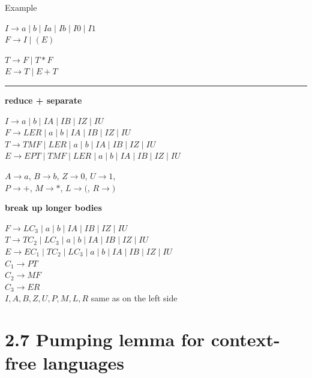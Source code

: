 \documentclass[handout]{beamer}
\begin{document}
\begin{frame}{Example}

	\begin{multicols}{2}
		
		$I\to a\mid b\mid Ia\mid Ib\mid I0\mid I1$\\
		$F\to I\mid (E)$
		
		$T\to F\mid T*F$\\
		$E\to T\mid E+T$
	\end{multicols}

	\bigskip
	\hrule

	\begin{multicols}{2}
		\small

		\textbf{reduce + separate}

		$I\to a\mid b\mid IA\mid IB\mid IZ\mid IU$\\
		$F\to LER\mid a\mid b\mid IA\mid IB\mid IZ\mid IU$\\
		$T\to TMF\mid LER\mid a\mid b\mid IA\mid IB\mid IZ\mid IU$\\
		$E\to EPT\mid TMF\mid LER\mid a\mid b\mid IA\mid IB\mid IZ\mid IU$\\

		\bigskip
		
		$A\to a$, $B\to b$, $Z\to 0$, $U\to 1$,\\
		$P\to +$, $M\to *$, $L\to ($, $R\to )$
		
		\bigskip\bigskip

		\textbf{break up longer bodies}

		$F\to LC_3\mid a\mid b\mid IA\mid IB\mid IZ\mid IU$\\
		$T\to TC_2\mid LC_3\mid a\mid b\mid IA\mid IB\mid IZ\mid IU$\\
		$E\to EC_1\mid TC_2\mid LC_3\mid a\mid b\mid IA\mid IB\mid IZ\mid IU$\\
		$C_1\to PT$\\
		$C_2\to MF$\\
		$C_3\to ER$\\
		$I,A,B,Z,U,P,M,L,R$ same as on the left side
	\end{multicols}

\end{frame}


\section{2.7 Pumping lemma for context-free languages}
\end{document}
